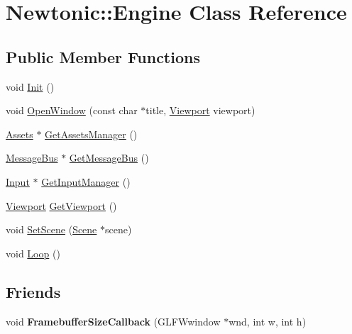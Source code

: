 \hypertarget{classNewtonic_1_1Engine}{}\section{Newtonic\+::Engine Class Reference}
\label{classNewtonic_1_1Engine}
\subsection*{Public Member Functions}
\begin{DoxyCompactItemize}
\item 
void \mbox{\hyperlink{classNewtonic_1_1Engine_ad0aeab0434bb214066f4ccecaf1cb28a}{Init}} ()
\item 
void \mbox{\hyperlink{classNewtonic_1_1Engine_ad1b027c39bdd7a345a6132f649441bec}{Open\+Window}} (const char $\ast$title, \mbox{\hyperlink{structNewtonic_1_1Viewport}{Viewport}} viewport)
\item 
\mbox{\hyperlink{classNewtonic_1_1Assets}{Assets}} $\ast$ \mbox{\hyperlink{classNewtonic_1_1Engine_abb99a60c574e6a2c59ddb9519d19e1a1}{Get\+Assets\+Manager}} ()
\item 
\mbox{\hyperlink{classNewtonic_1_1MessageBus}{Message\+Bus}} $\ast$ \mbox{\hyperlink{classNewtonic_1_1Engine_ac487e72315c9a328548c9a77966e50db}{Get\+Message\+Bus}} ()
\item 
\mbox{\hyperlink{classNewtonic_1_1Input}{Input}} $\ast$ \mbox{\hyperlink{classNewtonic_1_1Engine_a119890a520ef63c013c6bd2f34876797}{Get\+Input\+Manager}} ()
\item 
\mbox{\hyperlink{structNewtonic_1_1Viewport}{Viewport}} \mbox{\hyperlink{classNewtonic_1_1Engine_a9e487f8b5d4bb4088bfec307bc520b56}{Get\+Viewport}} ()
\item 
void \mbox{\hyperlink{classNewtonic_1_1Engine_aa893883220d08fdc3c075f45446a628e}{Set\+Scene}} (\mbox{\hyperlink{classNewtonic_1_1Scene}{Scene}} $\ast$scene)
\item 
void \mbox{\hyperlink{classNewtonic_1_1Engine_aa0ce67e45fe633d9994526b6dd9628cd}{Loop}} ()
\end{DoxyCompactItemize}
\subsection*{Friends}
\begin{DoxyCompactItemize}
\item 
\mbox{\label{classNewtonic_1_1Engine_a7ce0f5a539ad4b0496e153c9c72a837d}} 
void {\bfseries Framebuffer\+Size\+Callback} (G\+L\+F\+Wwindow $\ast$wnd, int w, int h)
\end{DoxyCompactItemize}


